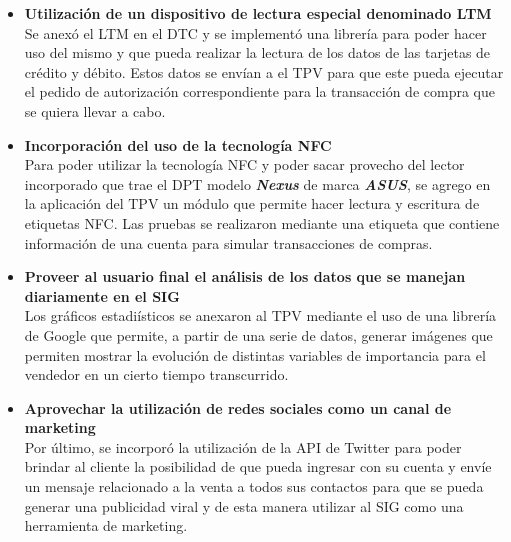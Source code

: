 \begin{itemize}
	\item \textbf{Utilizaci\'on de un dispositivo de lectura especial denominado \ac{LTM}}\\
	  Se anex\'o el \ac{LTM} en el \ac{DTC} y se implement\'o una librer\'ia para poder hacer uso del mismo y que pueda realizar la lectura de los datos de las tarjetas de cr\'edito y d\'ebito. Estos datos se env\'ian a el \ac{TPV} para que este pueda ejecutar el pedido de autorizaci\'on correspondiente para la transacci\'on de compra que se quiera llevar a cabo.

	\item \textbf{Incorporaci\'on del uso de la tecnolog\'ia \ac{NFC}}\\
		Para poder utilizar la tecnolog\'ia \ac{NFC} y poder sacar provecho del lector incorporado que trae el \ac{DPT} modelo \textbf{\textit{Nexus}} de marca \textbf{\textit{ASUS}}, se agrego en la aplicaci\'on del \ac{TPV} un m\'odulo que permite hacer lectura y escritura de etiquetas \ac{NFC}. Las pruebas se realizaron mediante una etiqueta que contiene informaci\'on de una cuenta para simular transacciones de compras.
	
	\item \textbf{Proveer al usuario final el an\'alisis de los datos que se manejan diariamente en el \ac{SIG}}\\
		Los gr\'aficos estadi\'isticos se anexaron al \ac{TPV} mediante el uso de una librer\'ia de Google\Si{\texttrademark} que permite, a partir de una serie de datos, generar im\'agenes que permiten mostrar la evoluci\'on de distintas variables de importancia para el vendedor en un cierto tiempo transcurrido.
	
	\item \textbf{Aprovechar la utilizaci\'on de redes sociales como un canal de marketing}\\
    Por \'ultimo, se incorpor\'o la utilizaci\'on de la \ac{API} de Twitter\Si{\texttrademark} para poder brindar al cliente la posibilidad de que pueda ingresar con su cuenta y env\'ie un mensaje relacionado a la venta a todos sus contactos para que se pueda generar una publicidad viral y de esta manera utilizar al \ac{SIG} como una herramienta de marketing.   	
\end{itemize}